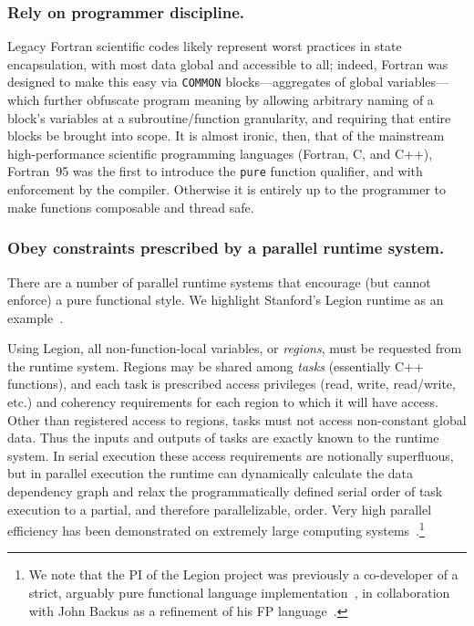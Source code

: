 \documentclass{llncs}
\begin{document}
\subsubsection{Rely on programmer discipline.}
Legacy Fortran scientific codes likely represent worst practices in state
encapsulation, with most data global and accessible to all; indeed, Fortran
was designed to make this easy via \texttt{COMMON} blocks---aggregates of
global variables---which further obfuscate program meaning by allowing
arbitrary naming of a block's variables at a subroutine/function granularity,
and requiring that entire blocks be brought into scope.  It is almost ironic,
then, that of the mainstream high-performance scientific programming languages
(Fortran, C, and C++), Fortran~95 was the first to introduce the \texttt{pure}
function qualifier, and with enforcement by the compiler.  Otherwise it is
entirely up to the programmer to make functions composable and thread safe.

\subsubsection{Obey constraints prescribed by a parallel runtime system.}
There are a number of parallel runtime systems that encourage (but cannot
enforce) a pure functional style.  We highlight Stanford's Legion
runtime as an example~\cite{Bauer12}.

Using Legion, all non-function-local variables, or \emph{regions}, must be
requested from the runtime system.  Regions may be shared among \emph{tasks}
(essentially C++ functions), and each task is prescribed access privileges
(read, write, read/write, etc.) and coherency requirements for each region to
which it will have access.  Other than registered access to regions, tasks
must not access non-constant global data.  Thus the inputs and outputs of
tasks are exactly known to the runtime system.  In serial execution these
access requirements are notionally superfluous, but in parallel execution the
runtime can dynamically calculate the data dependency graph and relax the
programmatically defined serial order of task execution to a partial, and
therefore parallelizable, order.  Very high parallel efficiency has been
demonstrated on extremely large computing systems~\cite{Bauer14}.\footnote{We
  note that the PI of the Legion project was previously a co-developer of a
  strict, arguably pure functional language
  implementation~\cite{AikenFL,FLreport89}, in collaboration with John Backus
  as a refinement of his FP language~\cite{Backus:1978}.}
\end{document}
